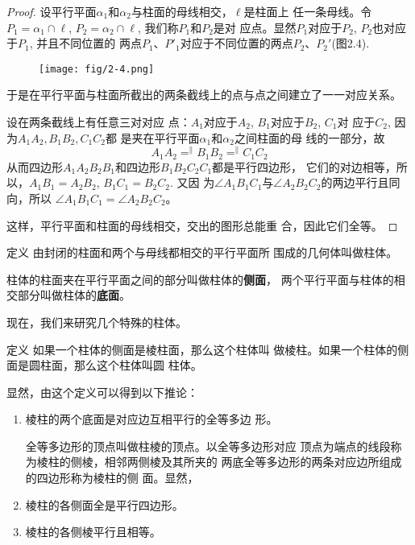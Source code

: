 \begin{proof}
    设平行平面$\alpha_1$和$\alpha_2$与柱面的母线相交，$\ell$是柱面上
任一条母线。令$P_1=\alpha_1\cap \ell$, $P_2=\alpha_2\cap\ell$, 我们称$P_1$和$P_2$是对
应点。显然$P_1$对应于$P_2$, $P_2$也对应于$P_1$, 并且不同位置的
两点$P_1$、$P'_1$对应于不同位置的两点$P_2$、$P_2'$(图2.4).

\begin{figure}[htp]
    \centering
    \texttt{[image: fig/2-4.png]}
    \caption{}
\end{figure}


于是在平行平面与柱面所截出的两条截线上的点与点之间建立了一一对应关系。

设在两条截线上有任意三对对应
点：$A_1$对应于$A_2$, $B_1$对应于$B_2$, $C_1$对
应于$C_2$, 因为$A_1A_2,B_1B_2,C_1C_2$都
是夹在平行平面$\alpha_1$和$\alpha_2$之间柱面的母
线的一部分，故
\[A_1A_2\mathop{=}^{\parallel} B_1B_2\mathop{=}^{\parallel}C_1C_2\]
从而四边形$A_1A_2B_2B_1$和四边形$B_1B_2C_2C_1$都是平行四边形，
它们的对边相等，所以，$A_1B_1=A_2B_2$, $B_1C_1=B_2C_2$. 又因
为$\angle A_1B_1C_1$与$\angle A_2B_2C_2$的两边平行且同向，所以
$\angle A_1B_1C_1=\angle A_2B_2C_2$。

这样，平行平面和柱面的母线相交，交出的图形总能重
合，因此它们全等。
\end{proof}


\begin{blk}{定义} 
    由封闭的柱面和两个与母线都相交的平行平面所
围成的几何体叫做柱体。

柱体的柱面夹在平行平面之间的部分叫做柱体的\textbf{侧面}，
两个平行平面与柱体的相交部分叫做柱体的\textbf{底面}。
    
\end{blk}

现在，我们来研究几个特殊的柱体。

\begin{blk}{定义} 
    如果一个柱体的侧面是棱柱面，那么这个柱体叫
做棱柱。如果一个柱体的侧面是圆柱面，那么这个柱体叫圆
柱体。    
\end{blk}

显然，由这个定义可以得到以下推论：
\begin{enumerate}
\item 棱柱的两个底面是对应边互相平行的全等多边
形。

全等多边形的顶点叫做柱棱的顶点。以全等多边形对应
顶点为端点的线段称为棱柱的侧棱，相邻两侧棱及其所夹的
两底全等多边形的两条对应边所组成的四边形称为棱柱的侧
面。显然，
\item 棱柱的各侧面全是平行四边形。
\item 棱柱的各侧棱平行且相等。
\end{enumerate}


